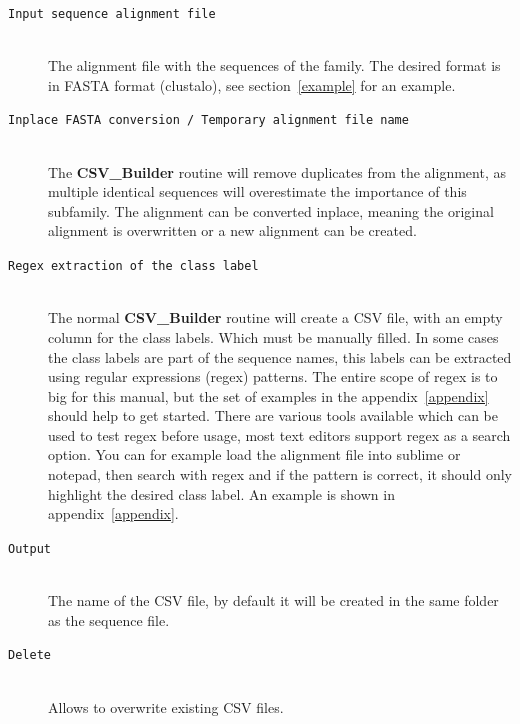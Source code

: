 \documentclass[a4paper,10pt]{article}
\begin{document}
\begin{description}

\item[\texttt{Input sequence alignment file}] \hfill \\
 
The alignment file with the sequences of the family.
The desired format is in FASTA format (clustalo), see section~\ref{example}
for an example.

\item[\texttt{Inplace FASTA conversion / Temporary alignment file name}] \hfill \\
 
The \textbf{CSV\_Builder} routine will remove duplicates from the 
alignment, as multiple identical sequences will overestimate the importance
of this subfamily. The alignment can be converted inplace, meaning
the original alignment is overwritten or a new alignment can be 
created.

\item[\texttt{Regex extraction of the class label}] \hfill \\
 
The normal \textbf{CSV\_Builder} routine will create a CSV file,
with an empty column for the class labels. Which must be manually 
filled.
In some cases the class labels are part of the sequence names,
this labels can be extracted using regular expressions (regex) patterns.
The entire scope of regex is to big for this manual, but the set of
examples in the appendix~\ref{appendix} should help to get started. There are various 
tools available which can be used to test regex before usage, most text editors 
support regex as a search option. You can 
for example load the alignment file into sublime or notepad, then
search with regex and if the pattern is correct, it should only highlight 
the desired class label. An example is shown in appendix~\ref{appendix}.

\item[\texttt{Output}] \hfill \\

The name of the CSV file, by default it will be created in the same folder as
the sequence file.

\item[\texttt{Delete}] \hfill \\

Allows to overwrite existing CSV files.

\end{description}
\end{document}

